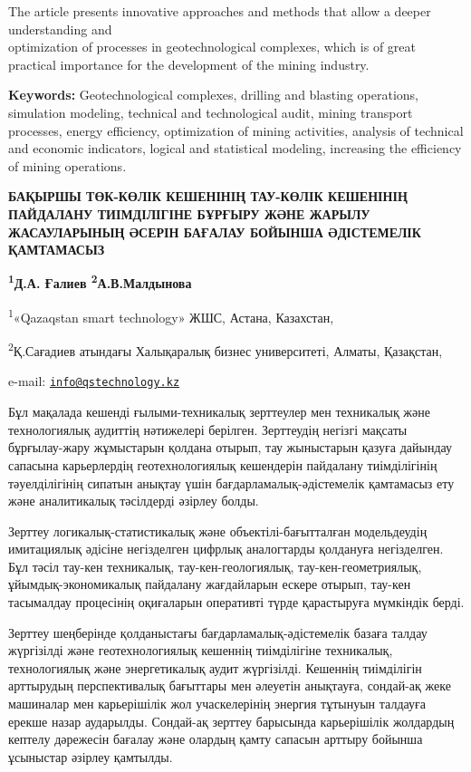 The article presents innovative approaches and methods that allow a
deeper understanding and \\optimization of processes in geotechnological
complexes, which is of great practical importance for the development of
the mining industry.

{\bfseries Keywords:} Geotechnological complexes, drilling and blasting
operations, simulation modeling, technical and technological audit,
mining transport processes, energy efficiency, optimization of mining
activities, analysis of technical and economic indicators, logical and
statistical modeling, increasing the efficiency of mining operations.

\begin{articleheader}
{\bfseries БАҚЫРШЫ ТӨК-КӨЛІК КЕШЕНІНІҢ ТАУ-КӨЛІК КЕШЕНІНІҢ ПАЙДАЛАНУ
ТИІМДІЛІГІНЕ БҰРҒЫРУ ЖӘНЕ ЖАРЫЛУ ЖАСАУЛАРЫНЫҢ ӘСЕРІН БАҒАЛАУ БОЙЫНША
ӘДІСТЕМЕЛІК ҚАМТАМАСЫЗ}

{\bfseries
\textsuperscript{1}Д.А. Ғалиев\textsuperscript{\envelope }
\textsuperscript{2}А.В.Малдынова
}
\end{articleheader}

\begin{affiliation}
\textsuperscript{1}«Qazaqstan smart technology» ЖШС, Астана, Казахстан,

\textsuperscript{2}Қ.Сағадиев атындағы Халықаралық бизнес университеті, Алматы, Қазақстан,

e-mail: \href{mailto:info@qstechnology.kz}{\nolinkurl{info@qstechnology.kz}}
\end{affiliation}

Бұл мақалада кешенді ғылыми-техникалық зерттеулер мен техникалық және
технологиялық аудиттің нәтижелері берілген. Зерттеудің негізгі мақсаты
бұрғылау-жару жұмыстарын қолдана отырып, тау жыныстарын қазуға дайындау
сапасына карьерлердің геотехнологиялық кешендерін пайдалану
тиімділігінің тәуелділігінің сипатын анықтау үшін
бағдарламалық-әдістемелік қамтамасыз ету және аналитикалық тәсілдерді
әзірлеу болды.

Зерттеу логикалық-статистикалық және объектілі-бағытталған модельдеудің
имитациялық әдісіне негізделген цифрлық аналогтарды қолдануға
негізделген. Бұл тәсіл тау-кен техникалық, тау-кен-геологиялық,
тау-кен-геометриялық, ұйымдық-экономикалық пайдалану жағдайларын ескере
отырып, тау-кен тасымалдау процесінің оқиғаларын оперативті түрде
қарастыруға мүмкіндік берді.

Зерттеу шеңберінде қолданыстағы бағдарламалық-әдістемелік базаға талдау
жүргізілді және геотехнологиялық кешеннің тиімділігіне техникалық,
технологиялық және энергетикалық аудит жүргізілді. Кешеннің тиімділігін
арттырудың перспективалық бағыттары мен әлеуетін анықтауға, сондай-ақ
жеке машиналар мен карьерішілік жол учаскелерінің энергия тұтынуын
талдауға ерекше назар аударылды. Сондай-ақ зерттеу барысында
карьерішілік жолдардың кептелу дәрежесін бағалау және олардың қамту
сапасын арттыру бойынша ұсыныстар әзірлеу қамтылды.


